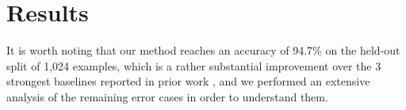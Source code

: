 \documentclass{article}
\begin{document}
\section{Results}\label{sec:results}

It is worth noting that our method reaches an accuracy of 94.7\% on the held-out
split of 1,024 examples, which is a rather substantial improvement over the 3
strongest baselines reported in prior work \citep{he2015deep}, and we performed
an extensive analysis of the remaining error cases in order to understand them.
\end{document}
